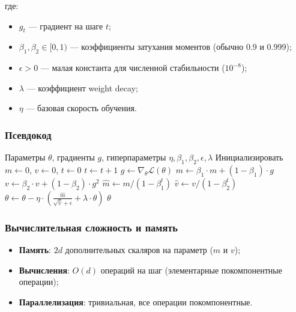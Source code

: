 \documentclass[a4paper,12pt]{article}
\begin{document}
где:
\begin{itemize}
    \item $g_t$ --- градиент на шаге $t$;
    \item $\beta_1, \beta_2 \in [0, 1)$ --- коэффициенты затухания моментов (обычно 0.9 и 0.999);
    \item $\epsilon > 0$ --- малая константа для численной стабильности ($10^{-8}$);
    \item $\lambda$ --- коэффициент weight decay;
    \item $\eta$ --- базовая скорость обучения.
\end{itemize}

\subsubsection{Псевдокод}

\begin{algorithm}[H]
\caption{AdamW (упрощённая версия)}
\label{alg:adamw}
\begin{algorithmic}[1]
\Require Параметры $\theta$, градиенты $g$, гиперпараметры $\eta, \beta_1, \beta_2, \epsilon, \lambda$
\State Инициализировать $m \gets 0$, $v \gets 0$, $t \gets 0$
    \State $t \gets t + 1$
    \State $g \gets \nabla_\theta \mathcal{L}(\theta)$ 
    \State $m \gets \beta_1 \cdot m + (1 - \beta_1) \cdot g$
    \State $v \gets \beta_2 \cdot v + (1 - \beta_2) \cdot g^2$
    \State $\hat{m} \gets m / (1 - \beta_1^t)$
    \State $\hat{v} \gets v / (1 - \beta_2^t)$
    \State $\theta \gets \theta - \eta \cdot \left( \frac{\hat{m}}{\sqrt{\hat{v}} + \epsilon} + \lambda \cdot \theta \right)$
\EndWhile
\State \Return $\theta$
\end{algorithmic}
\end{algorithm}

\subsubsection{Вычислительная сложность и память}

\begin{itemize}
    \item \textbf{Память}: $2d$ дополнительных скаляров на параметр ($m$ и $v$);
    \item \textbf{Вычисления}: $O(d)$ операций на шаг (элементарные покомпонентные операции);
    \item \textbf{Параллелизация}: тривиальная, все операции покомпонентные.
\end{itemize}
\end{document}
